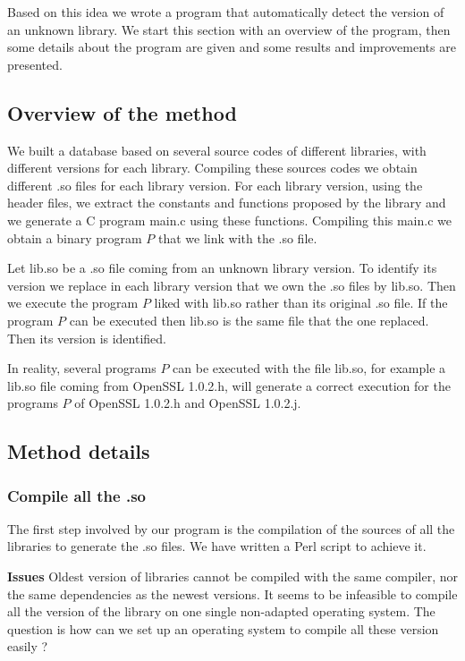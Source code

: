 \documentclass{article}
\begin{document}
    Based on this idea we wrote a program that automatically detect the version of an
    unknown library. We start this section with an overview of the program, then
    some details about the program are given and some results and improvements are
    presented.

	\subsection{Overview of the method}
   
    We built a database based on several source codes of different libraries,
    with different versions for each library. Compiling these sources codes we
    obtain different .so files for each library version. For each library
    version, using the header files, we extract the constants and functions
    proposed by the library and we generate a C program main.c using these
    functions.  Compiling this main.c we obtain a binary program $P$ that we
    link with the .so file.

    Let lib.so be a .so file coming from an unknown library version. To
    identify its version we replace in each library version that we own the
    .so files by lib.so. Then we execute the program $P$ liked with lib.so
    rather than its original .so file.  If the program $P$ can be executed
    then lib.so is the same file that the one replaced. Then its version is
    identified.
 
    In reality, several programs $P$ can be executed with the file lib.so, for
    example a lib.so file coming from OpenSSL 1.0.2.h, will generate a correct
    execution for the programs $P$ of OpenSSL 1.0.2.h and OpenSSL 1.0.2.j.
		
    \subsection{Method details}
	\subsubsection{Compile all the .so}
	
    The first step involved by our program is the compilation of the sources
    of all the libraries to generate the .so files. We have written a Perl
    script to achieve it.
	
    \textbf{Issues} Oldest version of libraries cannot be compiled with the
    same compiler, nor the same dependencies as the newest versions. It seems
    to be infeasible to compile all the version of the library on one single
    non-adapted operating system. The question is how can we set up an
    operating system to compile all these version easily ?
	
\end{document}
